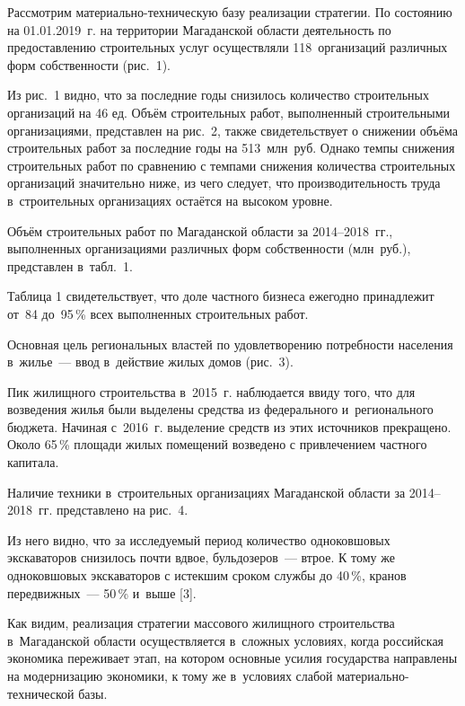 Рассмотрим материально-техническую базу реализации стратегии. По состоянию на 01.01.2019~г. на территории Магаданской области деятельность по предоставлению строительных услуг осуществляли 118~организаций различных форм собственности (рис.~1).

Из рис.~1 видно, что за последние годы снизилось количество строительных организаций на 46 ед. Объём строительных работ, выполненный строительными организациями, представлен на рис.~2, также свидетельствует о снижении объёма строительных работ за последние годы на 513~млн~руб. Однако темпы снижения строительных работ по сравнению с темпами снижения количества строительных организаций значительно ниже, из чего следует, что производительность труда в~строительных организациях остаётся на высоком уровне.




Объём строительных работ по Магаданской области за 2014--2018~гг., выполненных организациями различных форм собственности (млн~руб.), представлен в~табл.~1.



Таблица 1 свидетельствует, что доле частного бизнеса ежегодно принадлежит от~84 до~95\,\% всех выполненных строительных работ.




\clearpage
Основная цель региональных властей по удовлетворению потребности населения в~жилье~--- ввод в~действие жилых домов (рис.~3).

Пик жилищного строительства в~2015~г. наблюдается ввиду того, что для возведения жилья были выделены средства из федерального и~регионального бюджета. Начиная с~2016~г. выделение средств из этих источников прекращено. Около 65\,\%  площади жилых помещений возведено с привлечением частного капитала.

Наличие техники в~строительных организациях Магаданской области за 2014--2018~гг. представлено на рис.~4.





Из него видно, что за исследуемый период количество одноковшовых экскаваторов снизилось почти вдвое, бульдозеров~--- втрое. К тому же одноковшовых экскаваторов с истекшим сроком службы до 40\,\%, кранов передвижных~--- 50\,\% и~выше [3].

\clearpage
Как видим, реализация стратегии массового жилищного строительства в~Магаданской области осуществляется в~сложных условиях, когда российская экономика переживает этап, на котором основные усилия государства направлены на модернизацию экономики, к тому же в~условиях слабой материально-технической базы.

